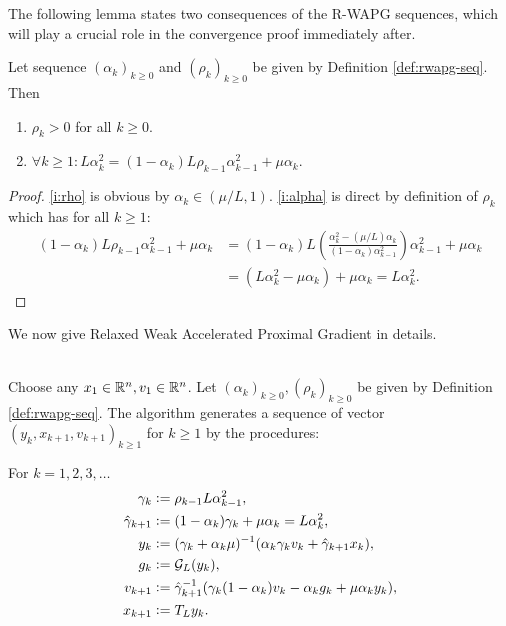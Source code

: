 \documentclass[12pt]{article}
\begin{document}
    The following lemma states two consequences of the R-WAPG sequences, which will play a crucial role in the convergence proof immediately after.
    \begin{lemma}\label{lemma:r-wapg-seq-consequences}
        Let sequence $(\alpha_k)_{k\ge 0}$ and $(\rho_k)_{k \ge0}$ be given by Definition \ref{def:rwapg-seq}. Then 
        \begin{enumerate}
            \item\label{i:rho} $\rho_k > 0$ for all $k \ge 0$.
            \item\label{i:alpha} $\forall k \ge 1: L\alpha_k^2 = (1 - \alpha_k)L\rho_{k - 1}\alpha_{k - 1}^2 +\mu\alpha_k$.
        \end{enumerate}
    \end{lemma}
    \begin{proof}
        \ref{i:rho} is obvious by $\alpha_k \in (\mu/L, 1)$.
        \ref{i:alpha} is direct by definition of $\rho_k$ which has for all $k \ge 1$:
        \begin{align*}
            (1 - \alpha_k)L \rho_{k - 1}\alpha_{k - 1}^2 + \mu\alpha_k
            &= (1 - \alpha_k)L \left(
                \frac{\alpha_{k}^2 - (\mu/L)\alpha_{k}}{(1 - \alpha_{k})\alpha_{k - 1}^2}
            \right)\alpha_{k - 1}^2 + \mu\alpha_k
            \\
            &= (L\alpha_k^2 - \mu \alpha_k) + \mu \alpha_k = L\alpha_k^2.
        \end{align*}
    \end{proof}
    \par
    We now give Relaxed Weak Accelerated Proximal Gradient in details.
    \begin{definition}\label{def:wapg}\;\\
        Choose any $x_1 \in \mathbb R^n, v_1 \in \mathbb R^n$.
        Let $(\alpha_k)_{k \ge0}, (\rho_k)_{k \ge 0}$ be given by Definition \ref{def:rwapg-seq}.
        The algorithm generates a sequence of vector $(y_k, x_{k + 1}, v_{k + 1})_{k \ge 1}$ for $k\ge 1$ by the procedures:
        \begin{tcolorbox}
            For $k=1, 2, 3, \ldots$
            \begin{align*}
                \gamma_k &\vcentcolon= \rho_{k -1}L\alpha_{k - 1}^2,
                \\
                \hat \gamma_{k + 1} & \vcentcolon= (1 - \alpha_k)\gamma_k + \mu \alpha_k = L\alpha_k^2,
                \\
                y_k &\vcentcolon=
                (\gamma_k + \alpha_k \mu)^{-1}(\alpha_k \gamma_k v_k + \hat\gamma_{k + 1} x_k),
                \\
                g_k &\vcentcolon= \mathcal G_L (y_k),
                \\
                v_{k + 1} &\vcentcolon=
                \hat\gamma^{-1}_{k + 1}
                (\gamma_k(1 - \alpha_k) v_k - \alpha_k g_k + \mu \alpha_k y_k),
                \\
                x_{k + 1} &\vcentcolon= T_L y_k.
            \end{align*}
        \end{tcolorbox}
    \end{definition}
\end{document}
